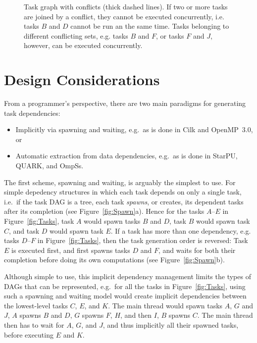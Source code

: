 \documentclass[fleqn,10pt]{wlpeerj}
\newcommand{\fig}[1]
    {Figure~\ref{fig:#1}}
\begin{document}
\begin{figure}
    \centerline{}
    \caption{Task graph with conflicts (thick dashed lines).
        If two or more tasks are joined by a conflict, they cannot be
        executed concurrently, i.e. tasks $B$ and $D$ cannot be run an
        the same time.
        Tasks belonging to different conflicting sets, e.g. tasks $B$
        and $F$, or tasks $F$ and $J$, however, can be executed
        concurrently.}
    \label{fig:TaskConflicts}
\end{figure}


\section{Design Considerations}

From a programmer's perspective, there are two main paradigms for generating
task dependencies:
\begin{itemize}
  \item Implicitly via spawning and waiting, e.g.~as is done in Cilk
    and OpenMP~3.0, or
  \item Automatic extraction from data dependencies, e.g.~as is done in
    StarPU, QUARK, and OmpSs.
\end{itemize}

The first scheme, spawning and waiting, is arguably the simplest to
use.
For simple depedency structures in which each task depends on only a
single task, i.e.~if the task DAG is a tree, each task {\em spawns}, or
creates, its dependent tasks after its completion (see \fig{Spawn}a).
Hence for the tasks $A$--$E$ in \fig{Tasks}, task $A$ would spawn
tasks $B$ and $D$, task $B$ would spawn task $C$, and task $D$ would
spawn task $E$.
If a task has more than one dependency, e.g. tasks $D$--$F$ in \fig{Tasks},
then the task generation order is reversed: Task $E$ is executed first,
and first spawns tasks $D$ and $F$, and waits for both their completion
before doing its own computations (see \fig{Spawn}b).

Although simple to use, this implicit dependency management
limits the types of DAGs that can be represented, e.g.~for
all the tasks in \fig{Tasks}, using such a spawning and waiting model
would create implicit dependencies between the lowest-level
tasks $C$, $E$, and $K$.
The main thread would spawn tasks $A$, $G$ and $J$, $A$ spawns $B$ and $D$,
$G$ spawns $F$, $H$, and then $I$, $B$ spawns $C$.
The main thread then has to wait for $A$, $G$, and $J$,
and thus implicitly all their spawned tasks, before executing
$E$ and $K$.
\end{document}
